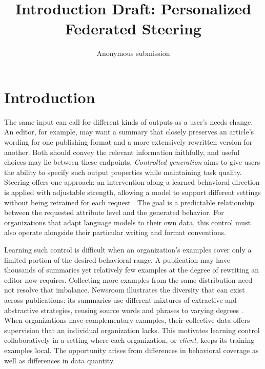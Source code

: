 \documentclass[11pt]{article}
\title{Introduction Draft: Personalized Federated Steering}
\author{Anonymous submission}
\begin{document}
\maketitle
\section{Introduction}
\label{sec:introduction}

The same input can call for different kinds of outputs as a user's needs change.
An editor, for example, may want a summary that closely preserves an article's wording for one publishing format and a more extensively rewritten version for another.
Both should convey the relevant information faithfully, and useful choices may lie between these endpoints.
\emph{Controlled generation} aims to give users the ability to specify such output properties while maintaining task quality.
Steering offers one approach: an intervention along a learned behavioral direction is applied with adjustable strength, allowing a model to support different settings without being retrained for each request \citep{rimsky-etal-2024-steering,fierro-roger-2026-weight}.
The goal is a predictable relationship between the requested attribute level and the generated behavior.
For organizations that adapt language models to their own data, this control must also operate alongside their particular writing and format conventions.

Learning such control is difficult when an organization's examples cover only a limited portion of the desired behavioral range.
A publication may have thousands of summaries yet relatively few examples at the degree of rewriting an editor now requires.
Collecting more examples from the same distribution need not resolve that imbalance.
Newsroom illustrates the diversity that can exist across publications: its summaries use different mixtures of extractive and abstractive strategies, reusing source words and phrases to varying degrees \citep{grusky-etal-2018-newsroom}.
When organizations have complementary examples, their collective data offers supervision that an individual organization lacks.
This motivates learning control collaboratively in a setting where each organization, or \emph{client}, keeps its training examples local.
The opportunity arises from differences in behavioral coverage as well as differences in data quantity.
\end{document}
